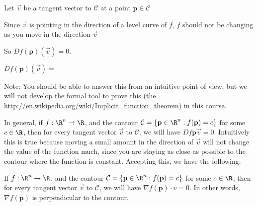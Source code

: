 \documentclass{ximera}
\begin{document}
\begin{question}
	Let $\vec{v}$ be a tangent vector to $\mathcal{C}$ at a point $\mathbf{p} \in \mathcal{C}$ 
	\begin{solution}
		\begin{hint}
			Since $\vec{v}$ is pointing in the direction of a level curve of $f$, $f$ should not be changing as you move in the direction $\vec{v}$
		\end{hint}
		\begin{hint}
			So $Df(\mathbf{p})(\vec{v}) = 0$.
		\end{hint}
		$Df(\mathbf{p})(\vec{v}) = $ 
		
		Note:  You should be able to answer this from an intuitive point of view, but we will not develop the formal tool to prove this 
	(the \href{implicit function theorem}{http://en.wikipedia.org/wiki/Implicit_function_theorem}) in this course.
	\end{solution}
	
	
\end{question}

In general, if $f:\R^n \to \R$, and the contour $\mathcal{C} = \{ \mathbf{p} \in \R^n :  f(\mathbf{p}) = c \}$ for some $c \in \R$, then for every tangent 
vector $\vec{v}$ to $\mathcal{C}$, we will have $Df{\mathbf{p}}{\vec{v}}  =0$.  
Intuitively this is true because moving a small amount in the direction of $\vec{v}$ will not change the value of the function much,
 since you are staying as close as possible to the contour where the function is constant.  Accepting this, we have the following:
 
 \begin{theorem}
  	If $f:\R^n \to \R$, and the contour $\mathcal{C} = \{ \mathbf{p} \in \R^n :  f(\mathbf{p}) = c \}$ for some $c \in \R$, then for every tangent 
vector $\vec{v}$ to $\mathcal{C}$, we will have $\nabla f(\mathbf{p}) \cdot v  =0$.  In other words, $\nabla f(\mathbf{p})$ is perpendicular to the 
contour.
 \end{theorem}
 
 
\end{document}
